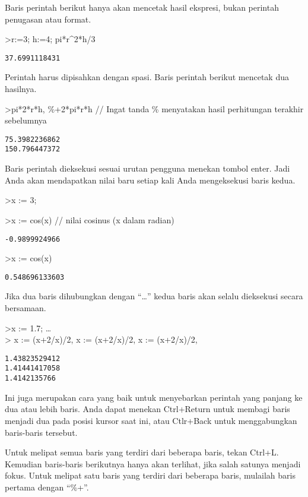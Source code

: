 \documentclass[
]{book}
\begin{document}
Baris perintah berikut hanya akan mencetak hasil ekspresi, bukan perintah penugasan atau format.

\textgreater r:=3; h:=4; pi*r\^{}2*h/3

\begin{verbatim}
37.6991118431
\end{verbatim}

Perintah harus dipisahkan dengan spasi. Baris perintah berikut mencetak dua hasilnya.

\textgreater pi*2*r*h, \%+2*pi*r*h // Ingat tanda \% menyatakan hasil perhitungan terakhir sebelumnya

\begin{verbatim}
75.3982236862
150.796447372
\end{verbatim}

Baris perintah dieksekusi sesuai urutan pengguna menekan tombol enter. Jadi Anda akan mendapatkan nilai baru setiap kali Anda mengeksekusi baris kedua.

\textgreater x := 3;

\textgreater x := cos(x) // nilai cosinus (x dalam radian)

\begin{verbatim}
-0.9899924966
\end{verbatim}

\textgreater x := cos(x)

\begin{verbatim}
0.548696133603
\end{verbatim}

Jika dua baris dihubungkan dengan ``\ldots{}'' kedua baris akan selalu dieksekusi secara bersamaan.

\textgreater x := 1.7; \ldots{}\\
\textgreater{} x := (x+2/x)/2, x := (x+2/x)/2, x := (x+2/x)/2,

\begin{verbatim}
1.43823529412
1.41441417058
1.4142135766
\end{verbatim}

Ini juga merupakan cara yang baik untuk menyebarkan perintah yang panjang ke dua atau lebih baris. Anda dapat menekan Ctrl+Return untuk membagi baris menjadi dua pada posisi kursor saat ini, atau Ctlr+Back untuk menggabungkan baris-baris tersebut.

Untuk melipat semua baris yang terdiri dari beberapa baris, tekan Ctrl+L. Kemudian baris-baris berikutnya hanya akan terlihat, jika salah satunya menjadi fokus. Untuk melipat satu baris yang terdiri dari beberapa baris, mulailah baris pertama dengan ``\%+''.
\end{document}
